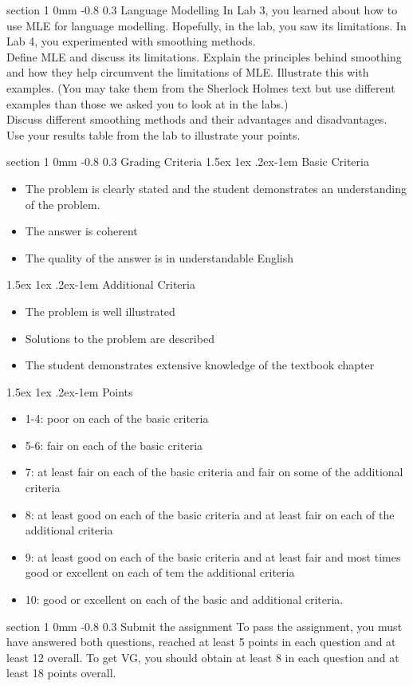 \documentclass[11pt]{article}
\makeatletter
\newenvironment{titlemize}[1]{%
    \paragraph{#1}
    \begin{itemize}}
            {\end{itemize}}
\renewcommand{\section}{\@startsection
{section}%
{1}%
{0mm}%
{-0.8\baselineskip}%
{0.3\baselineskip}%
{\bfseries\large}}%
\renewcommand{\paragraph}{%
  \@startsection{paragraph}{4}%
  {\z@}{1.5ex \@plus 1ex \@minus .2ex}{-1em}%
  {\normalfont\normalsize\bfseries}%
}\makeatother
\makeatother
\begin{document}
\section{Language Modelling}
\indent In Lab 3, you learned about how to use MLE for language modelling.
Hopefully, in the lab, you saw its limitations. 
In Lab 4, you experimented with smoothing methods.\\
\indent Define MLE and discuss its limitations. Explain the principles behind
smoothing and how they help circumvent the limitations of MLE. Illustrate this
with examples. (You may take them from the Sherlock Holmes text but use
different examples than those we asked you to look at in the labs.)\\
\indent Discuss different smoothing methods and their advantages and
disadvantages. Use your results table from the lab to illustrate your points.

\section{Grading Criteria}
\begin{titlemize}{Basic Criteria}
    \item The problem is clearly stated and the student demonstrates an
        understanding of the problem.
    \item The answer is coherent
    \item The quality of the answer is in understandable English
\end{titlemize}
\begin{titlemize}{Additional Criteria}
    \item The problem is well illustrated
    \item Solutions to the problem are described
    \item The student demonstrates extensive knowledge of the textbook chapter
\end{titlemize}

\begin{titlemize}{Points}
    \item 1-4: poor on each of the basic criteria
    \item 5-6: fair on each of the basic criteria
    \item 7: at least fair on each of the basic criteria and fair on some of
        the additional criteria
    \item 8: at least good on each of the basic criteria and at least fair on
        each of the additional criteria
    \item 9: at least good on each of the basic criteria and at least fair and
        most times good or excellent on each of tem the additional criteria
    \item 10: good or excellent on each of the basic and additional criteria.
\end{titlemize}

\section{Submit the assignment}
To pass the assignment, you must have answered both questions, reached at least
5 points in each question and at least 12 overall.
To get VG, you should obtain at least 8 in each question and at least 18 points
overall.
\end{document}

